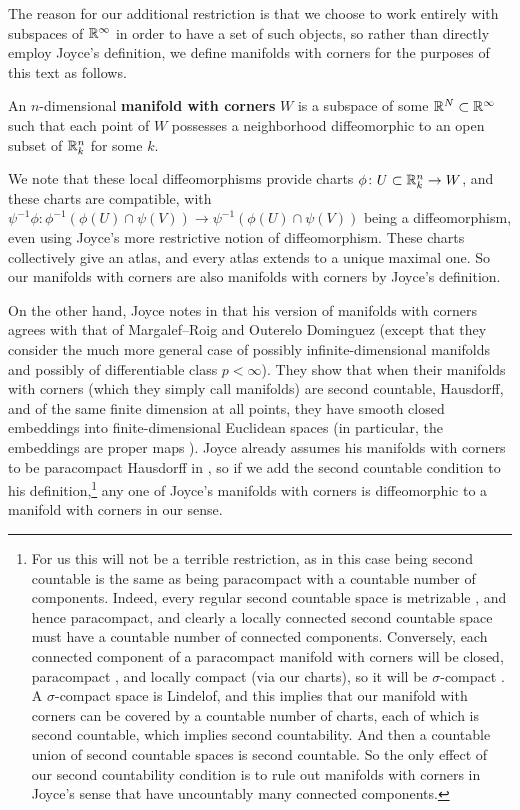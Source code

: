 The reason for our additional restriction is that we choose to work entirely with subspaces of $\mathbb{R}^\infty$ in order to have a set of such objects, so rather than directly employ Joyce's definition, we define manifolds with corners for the purposes of this text as follows.

\begin{definition}\label{D: MWC}
	An $n$-dimensional \textbf{manifold with corners} $W$ is a subspace of some $\mathbb{R}^N \subset \mathbb{R}^\infty$ such that each point of $W$ possesses a neighborhood diffeomorphic to an open subset of $\mathbb{R}^n_k$ for some $k$.
\end{definition}

We note that these local diffeomorphisms provide charts $\phi \colon U \subset \mathbb{R}^n_k \to W$, and these charts are compatible, with $\psi^{-1}\phi \colon \phi^{-1}(\phi(U) \cap \psi(V)) \to \psi^{-1}(\phi(U) \cap \psi(V))$ being a diffeomorphism, even using Joyce's more restrictive notion of diffeomorphism.
These charts collectively give an atlas, and every atlas extends to a unique maximal one.
So our manifolds with corners are also manifolds with corners by Joyce's definition.

On the other hand, Joyce notes in \cite[Remark 2.11 (see also Remark 6.3)]{Joy12} that his version of manifolds with corners agrees with that of Margalef--Roig and Outerelo Dominguez \cite{MaDo92} (except that they consider the much more general case of possibly infinite-dimensional manifolds and possibly of differentiable class $p<\infty$).
They show that when their manifolds with corners (which they simply call manifolds) are second countable, Hausdorff, and of the same finite dimension at all points, they have smooth closed embeddings into finite-dimensional Euclidean spaces \cite[Corollary 11.3.10]{MaDo92} (in particular, the embeddings are proper maps \cite[Proposition 3.3.4]{MaDo92}).
Joyce already assumes his manifolds with corners to be paracompact Hausdorff in \cite[Definition 2.1]{Joy12}, so if we add the second countable condition to his definition,\footnote{\label{F: countable}For us this will not be a terrible restriction, as in this case being second countable is the same as being paracompact with a countable number of components.
Indeed, every regular second countable space is metrizable \cite[Theorem 34.1]{Mu00}, and hence paracompact, and clearly a locally connected second countable space must have a countable number of connected components.
Conversely, each connected component of a paracompact manifold with corners will be closed, paracompact \cite[Theorem 41.2]{Mu00}, and locally compact (via our charts), so it will be $\sigma$-compact \cite[Appendix A.1]{Sp79}.
A $\sigma$-compact space is Lindelof, and this implies that our manifold with corners can be covered by a countable number of charts, each of which is second countable, which implies second countability.
And then a countable union of second countable spaces is second countable.
So the only effect of our second countability condition is to rule out manifolds with corners in Joyce's sense that have uncountably many connected components.}
any one of Joyce's manifolds with corners is diffeomorphic to a manifold with corners in our sense.

